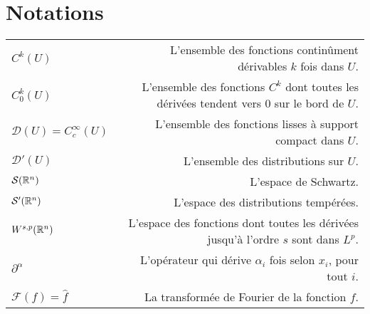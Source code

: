 


\setcounter{tocdepth}{2} %

\setcounter{secnumdepth}{3} %

\manualmark
\markboth{\spacedlowsmallcaps{\contentsname}}{\spacedlowsmallcaps{\contentsname}}
\tableofcontents 
{}
\renewcommand{\chaptermark}[1]{\markboth{\spacedlowsmallcaps{#1}}{\spacedlowsmallcaps{#1}}}
\renewcommand{\sectionmark}[1]{\markright{\thesection\enspace\spacedlowsmallcaps{#1}}}

\clearpage

      

\chapter*{Notations}
\begin{tabular}{lr}
  $C^k(U)$ & L'ensemble des fonctions continûment dérivables $k$ fois dans $U$.\\
  $C^k_0(U)$ & L'ensemble des fonctions $C^k$ dont toutes les dérivées tendent vers $0$ sur le bord de $U$.\\
  $\mathcal{D}(U) = C^{\infty}_c(U)$ & L'ensemble des fonctions lisses à support compact dans $U$.\\
  $\mathcal{D}'(U) $ & L'ensemble des distributions sur $U$.\\
  $\mathcal{S}(\mathbb{R}^n)$ & L'espace de Schwartz.\\
  $\mathcal{S}'(\mathbb{R}^n)$ & L'espace des distributions tempérées.\\
  $W^{s,p}(\mathbb{R}^n)$ & L'espace des fonctions dont toutes les dérivées jusqu'à l'ordre $s$ sont dans $L^p$.\\
  $\partial^{\alpha}$ & L'opérateur qui dérive $\alpha_i$ fois selon $x_i$, pour tout $i$.\\
  $\mathcal{F}(f)=\hat{f}$ & La transformée de Fourier de la fonction $f$.\\
\end{tabular}

\chantier